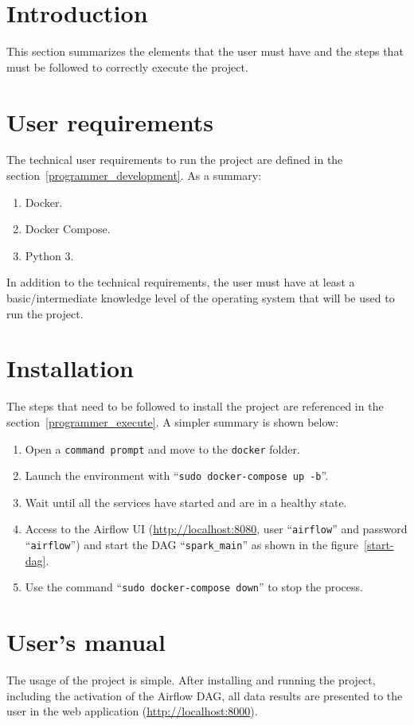 
\section{Introduction}
\nonzeroparskip This section summarizes the elements that the user must have and the steps that must be followed to correctly execute the project.

\section{User requirements}
\nonzeroparskip The technical user requirements to run the project are defined in the section~\ref{programmer_development}. As a summary:
\begin{enumerate}
	\item Docker.
	\item Docker Compose.
	\item Python 3.
\end{enumerate}

\nonzeroparskip In addition to the technical requirements, the user must have at least a basic/intermediate knowledge level of the operating system that will be used to run the project.

\section{Installation}
\nonzeroparskip The steps that need to be followed to install the project are referenced in the section~\ref{programmer_execute}. A simpler summary is shown below:
\begin{enumerate}
	\item Open a \texttt{command prompt} and move to the \texttt{docker} folder.
	\item Launch the environment with ``\texttt{sudo docker-compose up -b}''.
	\item Wait until all the services have started and are in a healthy state.
	\item Access to the Airflow UI (\url{http://localhost:8080}, user ``\texttt{airflow}'' and password ``\texttt{airflow}'') and start the DAG ``\texttt{spark\_main}'' as shown in the figure~\ref{start-dag}.
	\item Use the command ``\texttt{sudo docker-compose down}'' to stop the process.
\end{enumerate}

\section{User's manual}
\nonzeroparskip The usage of the project is simple. After installing and running the project, including the activation of the Airflow DAG, all data results are presented to the user in the web application (\url{http://localhost:8000}).